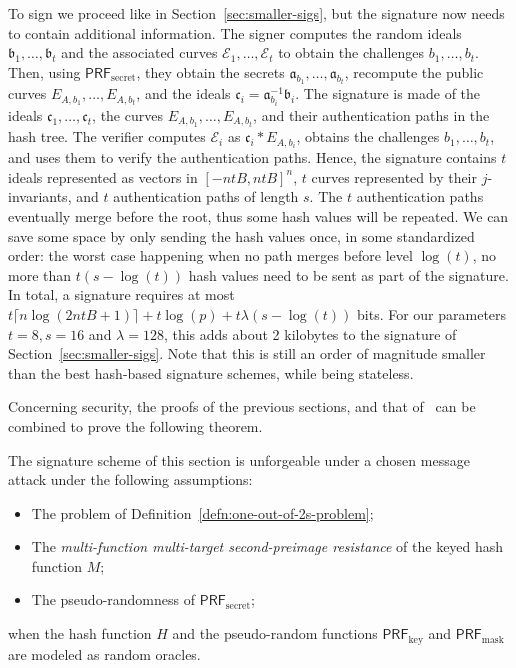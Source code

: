 \documentclass{llncs}
\newcommand{\E}{\mathcal{E}}
\renewcommand{\a}{\mathfrak{a}}
\renewcommand{\b}{\mathfrak{b}}
\renewcommand{\c}{\mathfrak{c}}
\newcommand{\PRF}{\mathsf{PRF}}
\newcommand{\PRFk}{\PRF_{\mathrm{key}}}
\newcommand{\PRFm}{\PRF_{\mathrm{mask}}}
\newcommand{\PRFs}{\PRF_{\mathrm{secret}}}
\begin{document}
To sign we proceed like in Section~\ref{sec:smaller-sigs}, but the signature now needs to contain additional information.
The signer computes the random ideals $\b_1,\dots,\b_t$ and the associated curves $\E_1,\dots,\E_t$ to obtain the challenges $b_1,\dots,b_t$.
Then, using $\PRFs$, they obtain the secrets $\a_{b_1},\dots,\a_{b_t}$, recompute the public curves $E_{A,b_1},\dots,E_{A,b_t}$, and the ideals $\c_i=\a_{b_i}^{-1}\b_i$.
The signature is made of the ideals $\c_1,\dots,\c_t$, the curves $E_{A,b_1},\dots,E_{A,b_t}$, and their authentication paths in the hash tree.
The verifier computes $\E_i$ as $\c_i * E_{A,b_i}$, obtains the challenges $b_1,\dots,b_t$, and uses them to verify the authentication paths.
Hence, the signature contains $t$ ideals represented as vectors in $[-ntB,ntB]^n$, $t$ curves represented by their $j$-invariants, and $t$ authentication paths of length $s$.
The $t$ authentication paths eventually merge before the root, thus some hash values will be repeated.
We can save some space by only sending the hash values once, in some standardized order: the worst case happening when no path merges before level $\log(t)$, no more than $t(s-\log(t))$ hash values need to be sent as part of the signature.
In total, a signature requires at most $t\lceil n \log(2ntB+1)\rceil + t\log(p) + t\lambda(s-\log(t))$ bits.
For our parameters $t=8, s=16$ and $\lambda=128$, this adds about 2 kilobytes to the signature of Section~\ref{sec:smaller-sigs}.
Note that this is still an order of magnitude smaller than the best hash-based signature schemes, while being stateless.

Concerning security, the proofs of the previous sections, and that of~\cite[Appendix~B]{10.1007/978-3-662-49384-7_15} can be combined to prove the following theorem.

\begin{theorem}
  The signature scheme of this section is unforgeable under a chosen
  message attack under the following assumptions:
  \begin{itemize}
  \item The problem of Definition~\ref{defn:one-out-of-2s-problem};
  \item The \emph{multi-function multi-target second-preimage resistance} of
    the keyed hash function $M$;
  \item The pseudo-randomness of $\PRFs$;
  \end{itemize}
  when the hash function $H$ and the pseudo-random functions $\PRFk$
  and $\PRFm$ are modeled as random oracles.
\end{theorem}
\end{document}
